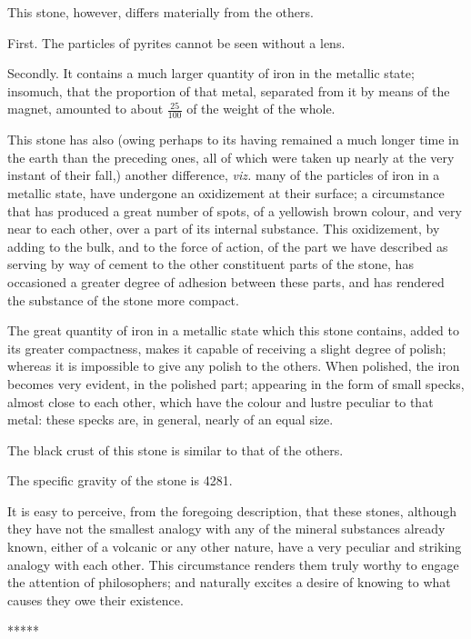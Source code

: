 \documentclass[a4paper, 12pt, oneside]{article}
\begin{document}
This stone, however, differs materially from the others.

First. The particles of pyrites cannot be seen without a lens.

Secondly. It contains a much larger quantity of iron in the metallic state; insomuch, that the proportion of that metal, separated from it by means of the magnet, amounted to about $\frac{25}{100}$ of the weight of the whole.

This stone has also (owing perhaps to its having remained a much longer time in the earth than the preceding ones, all of which were taken up nearly at the very instant of their fall,) another difference, \emph{viz.} many of the particles of iron in a metallic state, have undergone an oxidizement at their surface; a circumstance that has produced a great number of spots, of a yellowish brown colour, and very near to each other, over a part of its internal substance. This oxidizement, by adding to the bulk, and to the force of action, of the part we have described as serving by way of cement to the other constituent parts of the stone, has occasioned a greater degree of adhesion between these parts, and has rendered the substance of the stone more compact.

The great quantity of iron in a metallic state which this stone contains, added to its greater compactness, makes it capable of receiving a slight degree of polish; whereas it is impossible to give any polish to the others. When polished, the iron becomes very evident, in the polished part; appearing in the form of small specks, almost close to each other, which have the colour and lustre peculiar to that metal: these specks are, in general, nearly of an equal size.

The black crust of this stone is similar to that of the others.

The specific gravity of the stone is 4281.

It is easy to perceive, from the foregoing description, that these stones, although they have not the smallest analogy with any of the mineral substances already known, either of a volcanic or any other nature, have a very peculiar and striking analogy with each other. This circumstance renders them truly worthy to engage the attention of philosophers; and naturally excites a desire of knowing to what causes they owe their existence.

\centerline{*\hspace{15mm}*\hspace{15mm}*\hspace{15mm}*\hspace{15mm}*}
\bigskip
\end{document}
